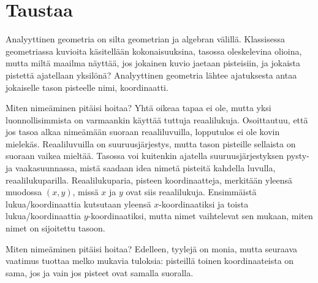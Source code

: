 \section{Taustaa}


Analyyttinen geometria on silta geometrian ja algebran välillä. Klassisessa geometriassa kuvioita käsitellään kokonaisuuksina, tasossa oleskelevina olioina, mutta miltä maailma näyttää, jos jokainen kuvio jaetaan pisteisiin, ja jokaista pistettä ajatellaan yksilönä? Analyyttinen geometria lähtee ajatuksesta antaa jokaiselle tason pisteelle nimi, koordinaatti.

Miten nimeäminen pitäisi hoitaa? Yhtä oikeaa tapaa ei ole, mutta yksi luonnollisimmista on varmaankin käyttää tuttuja reaalilukuja. Osoittautuu, että jos tasoa alkaa nimeämään suoraan reaaliluvuilla, lopputulos ei ole kovin mielekäs. Reaaliluvuilla on suuruusjärjestys, mutta tason pisteille sellaista on suoraan vaikea mieltää. Tasossa voi kuitenkin ajatella suuruusjärjestyksen pysty- ja vaakasuunnassa, mistä saadaan idea nimetä pisteitä kahdella luvulla, reaalilukuparilla. Reaalilukuparia, pisteen koordinaatteja, merkitään yleensä muodossa $(x,y)$, missä $x$ ja $y$ ovat siis reaalilukuja. Ensimmäistä lukua/koordinaattia kutsutaan yleensä $x$-koordinaatiksi ja toista lukua/koordinaattia $y$-koordinaatiksi, mutta nimet vaihtelevat sen mukaan, miten nimet on sijoitettu tasoon.

Miten nimeäminen pitäisi hoitaa? Edelleen, tyylejä on monia, mutta seuraava vaatimus tuottaa melko mukavia tuloksia: pisteillä toinen koordinaateista on sama, jos ja vain jos pisteet ovat samalla suoralla.